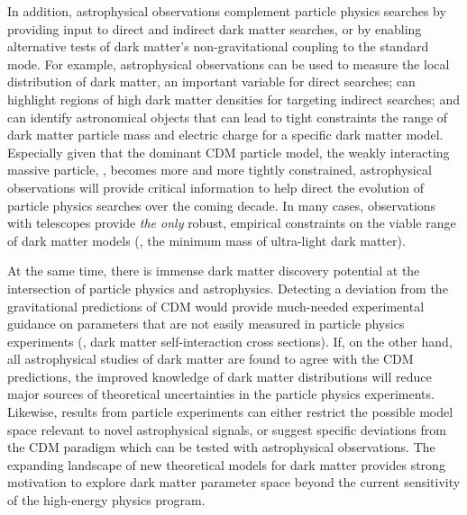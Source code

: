 In addition, astrophysical observations complement particle physics searches by providing input to direct and indirect dark matter searches, or by enabling alternative tests of dark matter's non-gravitational coupling to the standard mode.  
For example, astrophysical observations can be used to measure the local distribution of dark matter, an important variable for direct searches; can highlight regions of high dark matter densities for targeting indirect searches; and can identify astronomical objects that can lead to tight constraints the range of dark matter particle mass and electric charge for a specific dark matter model.  
Especially given that the dominant CDM particle model, the weakly interacting massive particle,  \citep[WIMP;][]{steigman1985}, becomes more and more tightly constrained, astrophysical observations will provide critical information to help direct the evolution of particle physics searches over the coming decade.  
In many cases, observations with telescopes provide \emph{the only} robust, empirical constraints on the viable range of dark matter models (\ie, the minimum mass of ultra-light dark matter).

At the same time, there is immense dark matter discovery potential at the intersection of particle physics and astrophysics.
Detecting a deviation from the gravitational predictions of CDM would provide much-needed experimental guidance on parameters that are not easily measured in particle physics experiments (\eg, dark matter self-interaction cross sections). 
If, on the other hand, all astrophysical studies of dark matter are found to agree with the CDM predictions, the improved knowledge of dark matter distributions will reduce major sources of theoretical uncertainties in the particle physics experiments. 
Likewise, results from particle experiments can either restrict the possible model space relevant to novel astrophysical signals, or suggest specific deviations from the CDM paradigm which can be tested with astrophysical observations.
The expanding landscape of new theoretical models for dark matter provides strong motivation to explore dark matter parameter space beyond the current sensitivity of the high-energy physics program.

